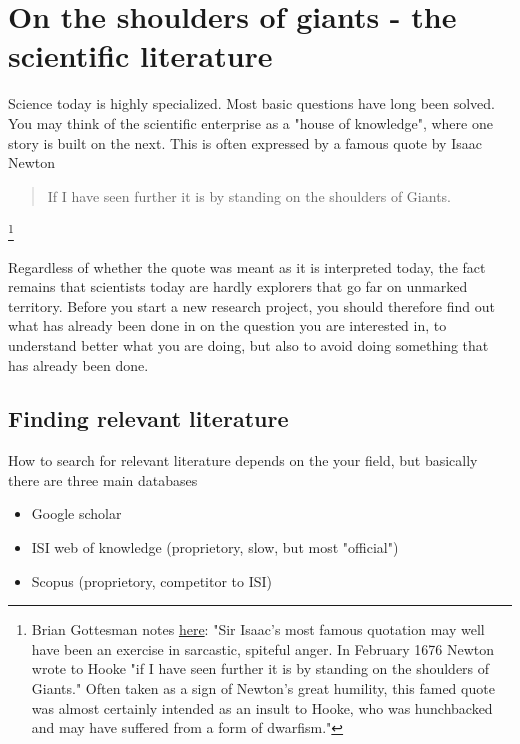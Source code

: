 \documentclass{tufte-book}
\begin{document}


\chapter{On the shoulders of giants - the scientific literature}

Science today is highly specialized. Most basic questions have long been solved. You may think of the scientific enterprise as a "house of knowledge", where one story is built on the next. This is often expressed by a famous quote by Isaac Newton 

\begin{quote}
If I have seen further it is by standing on the shoulders of Giants.
\end{quote}\footnote{Brian Gottesman notes \href{http://mentalfloss.com/article/24520/6-things-you-should-know-about-isaac-newton}{here}: "Sir Isaac's most famous quotation may well have been an exercise in sarcastic, spiteful anger. In February 1676 Newton wrote to Hooke "if I have seen further it is by standing on the shoulders of Giants." Often taken as a sign of Newton's great humility, this famed quote was almost certainly intended as an insult to Hooke, who was hunchbacked and may have suffered from a form of dwarfism."
}

Regardless of whether the quote was meant as it is interpreted today, the fact remains that scientists today are hardly explorers that go far on unmarked territory. Before you start a new research project, you should therefore find out what has already been done in on the question you are interested in, to understand better what you are doing, but also to avoid doing something that has already been done. 


\section{Finding relevant literature}

How to search for relevant literature depends on the your field, but basically there are three main databases

\begin{itemize}
\item Google scholar 
\item ISI web of knowledge (proprietory, slow, but most "official")
\item Scopus (proprietory, competitor to ISI)
\end{itemize}
\end{document}
